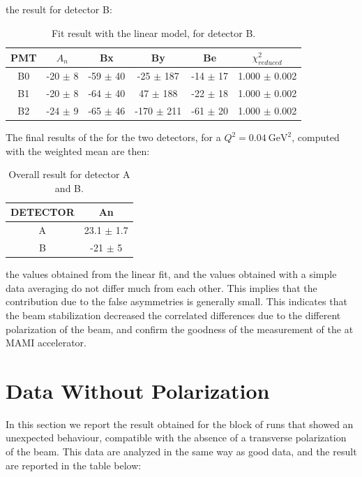 the result for detector B: 

\begin{table}[hbtp]
\centering
\begin{tabular}{c|c|c|c|c|c}
\hline
 PMT   & $A_{n}$         & Bx         & By           & Be        & $\chi^{2}_{reduced}$\\
\hline
 B0    & -20 $\pm$ 8 & -59 $\pm$ 40 & -25 $\pm$ 187  & -14 $\pm$ 17  & 1.000 $\pm$ 0.002 \\
 B1    & -20 $\pm$ 8  & -64 $\pm$ 40 & 47 $\pm$ 188    & -22 $\pm$ 18 & 1.000 $\pm$ 0.002 \\
 B2    & -24 $\pm$ 9 & -65 $\pm$ 46 & -170 $\pm$ 211 & -61 $\pm$ 20 & 1.000 $\pm$ 0.002 \\
\hline
\end{tabular}
\caption{Fit result with the linear model, for detector B.}
\end{table}

The final results of the \transv for the two detectors, for a $Q^{2} = \SI{0.04}{\giga \electronvolt \squared}$, computed with the weighted mean are then:

\begin{table}[h]
\centering
\begin{tabular}{c|c}
\hline
 DETECTOR   & An    \\
\hline
 A          & 23.1 $\pm$ 1.7  \\
 B          & -21 $\pm$ 5   \\
\hline
\end{tabular}
\caption{Overall result for detector A and B.}
\label{tab:RisultatiBellissimiFinali}
\end{table}

the values obtained from the linear fit, and the values obtained with a simple data averaging do not differ much from each other. This implies that the contribution due to the false asymmetries is generally small. This indicates that the beam stabilization decreased the correlated differences due to the different polarization of the beam, and confirm the goodness of the measurement of the \transv at MAMI accelerator.  

\section{Data Without Polarization}

In this section we report the result obtained for the block of runs that showed an unexpected behaviour, compatible with the absence of a transverse polarization of the beam. This data are analyzed in the same way as good data, and the result are reported in the table below: 

